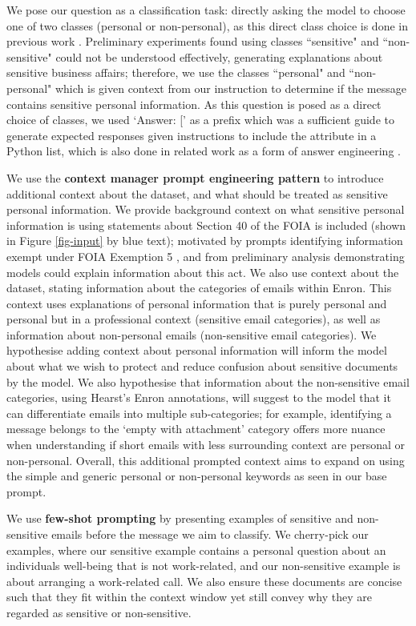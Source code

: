 We pose our question as a classification task: directly asking the model to choose one of two classes (personal or non-personal), as this direct class choice is done in previous work \cite{kocon2023chatgpt, puri2019zero}. Preliminary experiments found using classes ``sensitive" and ``non-sensitive" could not be understood effectively, generating explanations about sensitive business affairs; therefore, we use the classes ``personal" and ``non-personal" which is given context from our instruction to determine if the message contains sensitive personal information. As this question is posed as a direct choice of classes, we used `Answer: [' as a prefix which was a sufficient guide to generate expected responses given instructions to include the attribute in a Python list, which is also done in related work as a form of answer engineering \cite{kocon2023chatgpt}.

We use the \textbf{context manager prompt engineering pattern} to introduce additional context about the dataset, and what should be treated as sensitive personal information. We provide background context on what sensitive personal information is using statements about Section 40 of the FOIA is included (shown in Figure \ref{fig-input} by blue text); motivated by prompts identifying information exempt under FOIA Exemption 5 \cite{baron2023using}, and from preliminary analysis demonstrating models could explain information about this act. We also use context about the dataset, stating information about the categories of emails within Enron. This context uses explanations of personal information that is purely personal and personal but in a professional context (sensitive email categories), as well as information about non-personal emails (non-sensitive email categories). We hypothesise adding context about personal information will inform the model about what we wish to protect and reduce confusion about sensitive documents by the model. We also hypothesise that information about the non-sensitive email categories, using Hearst’s Enron annotations, will suggest to the model that it can differentiate emails into multiple sub-categories; for example, identifying a message belongs to the ‘empty with attachment’ category offers more nuance when understanding if short emails with less surrounding context are personal or non-personal. Overall, this additional prompted context aims to expand on using the simple and generic personal or non-personal keywords as seen in our base prompt.

We use \textbf{few-shot prompting} by presenting examples of sensitive and non-sensitive emails before the message we aim to classify. We cherry-pick our examples, where our sensitive example contains a personal question about an individuals well-being that is not work-related, and our non-sensitive example is about arranging a work-related call. We also ensure these documents are concise such that they fit within the context window yet still convey why they are regarded as sensitive or non-sensitive.

